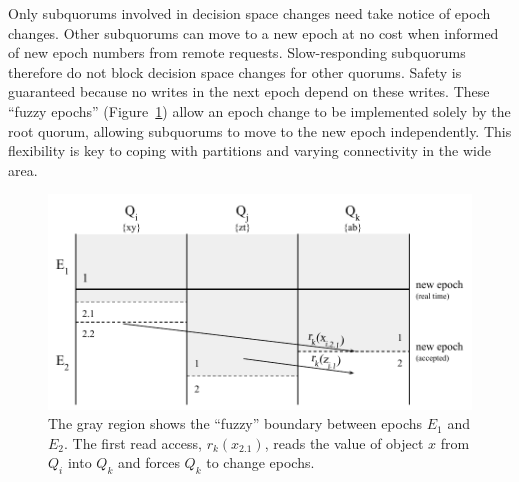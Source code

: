 \documentclass[11pt,letterpaper]{article}
\begin{document}
Only subquorums involved in decision space changes need take notice of
epoch changes.
Other subquorums can move to a new epoch at no cost when informed of new epoch
numbers from remote requests.
Slow-responding subquorums therefore do not block decision space changes for other
quorums.
Safety is guaranteed because no writes in the next epoch depend on these writes.
These ``fuzzy epochs'' (Figure~\ref{fig:fuzzy}) allow an epoch change to be implemented solely by the
root quorum, allowing subquorums to move to the new epoch independently.
This flexibility is key to coping with partitions and varying connectivity in
the wide area.
\begin{figure}[t]
\vspace{-.5in}
    \centering
    \includegraphics[height=0.2\textheight]{figures/fuzzy}
    \caption{The gray region shows the ``fuzzy'' boundary between epochs $E_1$
      and $E_2$. The first read access, $r_k(x_{2.1})$, reads the value of object $x$ from $Q_i$ into
      $Q_k$ and forces $Q_k$ to change epochs.}
    \label{fig:fuzzy}
\end{figure}

\end{document}
